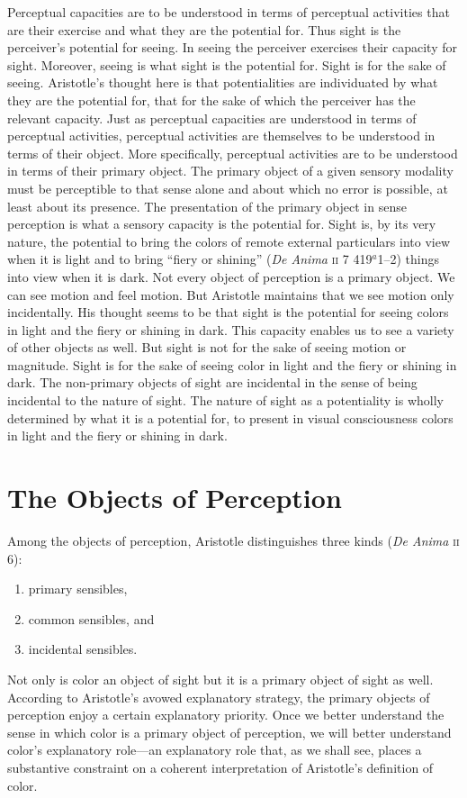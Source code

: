 Perceptual capacities are to be understood in terms of perceptual activities that are their exercise and what they are the potential for. Thus sight is the perceiver's potential for seeing. In seeing the perceiver exercises their capacity for sight. Moreover, seeing is what sight is the potential for. Sight is for the sake of seeing. Aristotle's thought here is that potentialities are individuated by what they are the potential for, that for the sake of which the perceiver has the relevant capacity. Just as perceptual capacities are understood in terms of perceptual activities, perceptual activities are themselves to be understood in terms of their object. More specifically, perceptual activities are to be understood in terms of their primary object. The primary object of a given sensory modality must be perceptible to that sense alone and about which no error is possible, at least about its presence. The presentation of the primary object in sense perception is what a sensory capacity is the potential for. Sight is, by its very nature, the potential to bring the colors of remote external particulars into view when it is light and to bring ``fiery or shining'' (\emph{De Anima} \textsc{ii} 7 419\( ^{a} \)1--2) things into view when it is dark. Not every object of perception is a primary object. We can see motion and feel motion. But Aristotle maintains that we see motion only incidentally. His thought seems to be that sight is the potential for seeing colors in light and the fiery or shining in dark. This capacity enables us to see a variety of other objects as well. But sight is not for the sake of seeing motion or magnitude. Sight is for the sake of seeing color in light and the fiery or shining in dark. The non-primary objects of sight are incidental in the sense of being incidental to the nature of sight. The nature of sight as a potentiality is wholly determined by what it is a potential for, to present in visual consciousness colors in light and the fiery or shining in dark.


\section{The Objects of Perception} %
\label{sec:the_objects_of_perception}

Among the objects of perception, Aristotle distinguishes three kinds (\emph{De Anima} \textsc{ii} 6):
\begin{enumerate}[(1)]
	\item primary sensibles,
	\item common sensibles, and
	\item incidental sensibles.
\end{enumerate}
Not only is color an object of sight but it is a primary object of sight as well. According to Aristotle's avowed explanatory strategy, the primary objects of perception enjoy a certain explanatory priority. Once we better understand the sense in which color is a primary object of perception, we will better understand color's explanatory role---an explanatory role that, as we shall see, places a substantive constraint on a coherent interpretation of Aristotle's definition of color.


